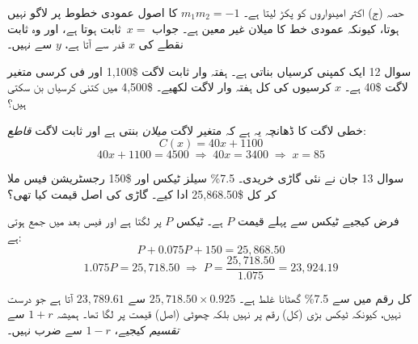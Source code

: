 \begin{ghalti}
حصہ (ج) اکثر امیدواروں کو پکڑ لیتا ہے۔ \(m_1m_2=-1\) کا اصول عمودی خطوط پر
لاگو نہیں ہوتا، کیونکہ عمودی خط کا میلان غیر معین ہے۔ جواب \(x=\)~ثابت ہوتا ہے،
اور وہ ثابت نقطے کی \(x\) قدر سے آتا ہے، \(y\) سے نہیں۔
\end{ghalti}

\begin{sawal}{سوال \textenglish{12}}
ایک کمپنی کرسیاں بناتی ہے۔ ہفتہ وار ثابت لاگت \textenglish{\$1{,}100} اور فی
کرسی متغیر لاگت \textenglish{\$40} ہے۔ \(x\) کرسیوں کی کل ہفتہ وار لاگت لکھیے۔
\textenglish{\$4{,}500} میں کتنی کرسیاں بن سکتی ہیں؟
\end{sawal}

\begin{hal}
خطی لاگت کا ڈھانچہ یہ ہے کہ متغیر لاگت \emph{میلان} بنتی ہے اور ثابت لاگت
\emph{قاطع}:
\[
C(x)=40x+1100
\]
\[
40x+1100=4500 \;\Longrightarrow\; 40x=3400 \;\Longrightarrow\; x=85
\]

\end{hal}

\begin{sawal}{سوال \textenglish{13}}
جان نے نئی گاڑی خریدی۔ \textenglish{7.5\%} سیلز ٹیکس اور \textenglish{\$150}
رجسٹریشن فیس ملا کر کل \textenglish{\$25{,}868.50} ادا کیے۔ گاڑی کی اصل قیمت
کیا تھی؟
\end{sawal}

\begin{hal}
فرض کیجیے ٹیکس سے پہلے قیمت \(P\) ہے۔ ٹیکس \(P\) پر لگتا ہے اور فیس بعد میں
جمع ہوتی ہے:
\[
P+0.075P+150=25{,}868.50
\]
\[
1.075P=25{,}718.50 \;\Longrightarrow\;
P=\frac{25{,}718.50}{1.075}=23{,}924.19
\]

\end{hal}

\begin{ghalti}
کل رقم میں سے \textenglish{7.5\%} گھٹانا غلط ہے۔ \(25{,}718.50\times 0.925\)
سے \(23{,}789.61\) آتا ہے جو درست نہیں، کیونکہ ٹیکس بڑی (کل) رقم پر نہیں بلکہ
چھوٹی (اصل) قیمت پر لگا تھا۔ ہمیشہ \(1+r\) سے \emph{تقسیم} کیجیے،
\(1-r\) سے ضرب نہیں۔
\end{ghalti}
